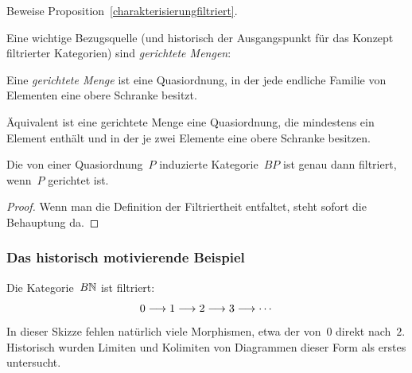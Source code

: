 \begin{aufg}Beweise Proposition~\ref{charakterisierungfiltriert}.\end{aufg}

Eine wichtige Bezugsquelle (und historisch der Ausgangspunkt für das Konzept
filtrierter Kategorien) sind \emph{gerichtete Mengen}:
\begin{defn}Eine \emph{gerichtete Menge} ist eine Quasiordnung, in der jede
endliche Familie von Elementen eine obere Schranke besitzt.\end{defn}
Äquivalent ist eine gerichtete Menge eine Quasiordnung, die mindestens ein
Element enthält und in der je zwei Elemente eine obere Schranke besitzen.
\begin{prop}Die von einer Quasiordnung~$P$ induzierte Kategorie~$BP$ ist genau
dann filtriert, wenn~$P$ gerichtet ist.\end{prop}
\begin{proof}Wenn man die Definition der Filtriertheit entfaltet, steht sofort
die Behauptung da.\end{proof}


\subsubsection*{Das historisch motivierende Beispiel}

Die Kategorie~$B\mathbb{N}$ ist filtriert:
\[ 0 \longrightarrow 1 \longrightarrow 2 \longrightarrow 3 \longrightarrow \cdots \]
In dieser Skizze fehlen natürlich viele Morphismen, etwa der von~$0$ direkt
nach~$2$. Historisch wurden Limiten und Kolimiten von Diagrammen dieser Form
als erstes untersucht.

